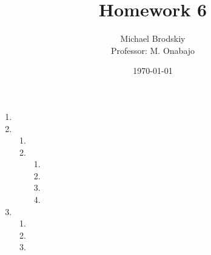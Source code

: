 


\title{Homework 6}
\date{\today}
\author{Michael Brodskiy\\ \small Professor: M. Onabajo}



\maketitle

\begin{enumerate}

  \item

  \item

    \begin{enumerate}

      \item 

      \item 

        \begin{enumerate}

          \item 

          \item 

          \item 

          \item 

        \end{enumerate}

    \end{enumerate}

  \item

    \begin{enumerate}

      \item 

      \item 

      \item 

    \end{enumerate}

\end{enumerate}



